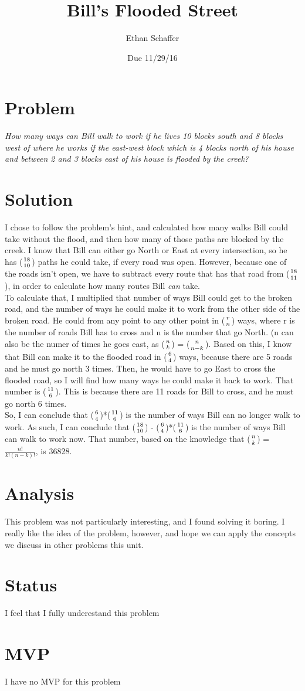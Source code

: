\documentclass[11pt]{article} %
\title{Bill's Flooded Street}
\author{Ethan Schaffer}
\date{Due 11/29/16}
\newcommand\tab[1][1cm]{\hspace*{#1}}
\begin{document}
\maketitle
\section* {Problem}
\textit{How many ways can Bill walk to work if he lives 10 blocks south and 8 blocks west of where he works if the east-west block which is 4 blocks north of his house and between 2 and 3 blocks east of his house is flooded by the creek?}

\section*{Solution}
I chose to follow the problem's hint, and calculated how many walks Bill could take without the flood, and then how many of those paths are blocked by the creek. I know that Bill can either go North or East at every intersection, so he has ($18 \atop 10$) paths he could take, if every road was open. However, because one of the roads isn't open, we have to subtract every route that has that road from ($18 \atop 11$), in order to calculate how many routes Bill \textit{can} take. 
\\  \tab To calculate that, I multiplied that number of ways Bill could get to the broken road, and the number of ways he could make it to work from the other side of the broken road. He could from any point to any other point in ($r \atop n$) ways, where r is the number of roads Bill has to cross and n is the number that go North. (n can also be the numer of times he goes east, as ($n \atop k$) = ($n \atop n-k$). Based on this, I know that Bill can make it to the flooded road in ($6 \atop 4$) ways, because there are 5 roads and he must go north 3 times. Then, he would have to go East to cross the flooded road, so I will find how many ways he could make it back to work. That number is ($11 \atop 6$). This is because there are 11 roads for Bill to cross, and he must go north 6 times. 
\\ \tab So, I can conclude that ($6 \atop4$)*($11 \atop 6$) is the number of ways Bill can no longer walk to work. As such, I can conclude that ($18 \atop 10$) - ($6 \atop4$)*($11 \atop 6$) is the number of ways Bill can walk to work now. That number, based on the knowledge that ($n \atop k$) = $\frac{n!}{k!(n-k)!}$, is 36828.

\section* {Analysis}This problem was not particularly interesting, and I found solving it boring. I really like the idea of the problem, however, and hope we can apply the concepts we discuss in other problems this unit.

\section* {Status} I feel that I fully underestand this problem

\section* {MVP} I have no MVP for this problem
\end{document}
